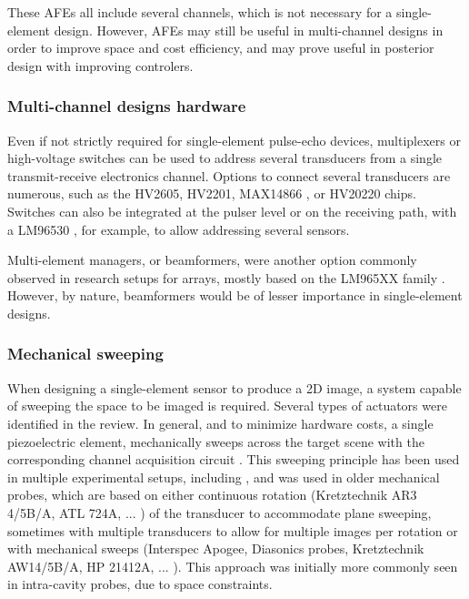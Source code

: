 \documentclass{article}
\begin{document}
These AFEs all include several channels, which is not necessary for a single-element design. However, AFEs may still be useful in multi-channel designs in order to improve space and cost efficiency, and may prove useful in posterior design with improving controlers.

\subsubsection{Multi-channel designs hardware}

Even if not strictly required for single-element pulse-echo devices, multiplexers or high-voltage switches can be used to address several transducers from a single transmit-receive electronics channel. Options to connect several transducers are numerous, such as the HV2605, HV2201, MAX14866 \cite{enwia_open-source_2019, pashaei_flexible_2020, enwia_open-source_2020}, or HV20220 \cite{li_new_2014} chips. Switches can also be integrated at the pulser level \cite{worthing_using_2016, hidayat_determination_2020} or on the receiving path, with a LM96530 \cite{gwirc_desarrollo_2019, vasudevan_programmable_2014, roman_open-source_2018}, for example, to allow addressing several sensors.

Multi-element managers, or beamformers, were another option commonly observed in research setups for arrays, mostly based on the LM965XX family \cite{gwirc_desarrollo_2019, yu_low-power_2012, roman_open-source_2018, bharath_fpga-based_2015, roman_open-source_2018}. However, by nature, beamformers would be of lesser importance in single-element designs.

\subsubsection{Mechanical sweeping}

When designing a single-element sensor to produce a 2D image, a system capable of sweeping the space to be imaged is required. Several types of actuators were identified in the review. In general, and to minimize hardware costs, a single piezoelectric element, mechanically sweeps across the target scene with the corresponding channel acquisition circuit \cite{saijo_development_nodate}. This sweeping principle has been used in multiple experimental setups, including \cite{chang_low-cost_2009}, and was used in older mechanical probes, which are based on either continuous rotation (Kretztechnik AR3 4/5B/A, ATL 724A, ... ) of the transducer to accommodate plane sweeping, sometimes with multiple transducers to allow for multiple images per rotation or with mechanical sweeps (Interspec Apogee, Diasonics probes, Kretztechnik AW14/5B/A, HP 21412A, ... ). This approach was initially more commonly seen in intra-cavity probes, due to space constraints. 
\end{document}
